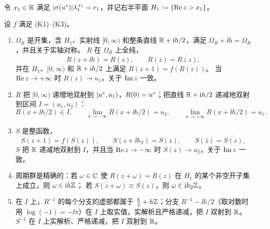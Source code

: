 令 $x_1\in\mathbb{R}$ 满足 $|\sigma(u^{*})|\lambda_1^{\,x_1}=r_1$，并记右半平面 $H_1:=\{\operatorname{Re} z>x_1\}$。

\begin{proposition}[周期性与实结构]\label{prop:regular-periodic}
设 $f$ 满足 \textup{(K1)--(K3)}。
\begin{enumerate}[label=(\alph*)]
\item $\Omega_R$ 是开集，含 $H_1$、实射线 $[0,\infty)$ 和整条直线 $\mathbb{R}+\mathrm{i} h/2$，满足 $\Omega_R+\ii h=\Omega_R$，并且关于实轴对称。
  $R$ 在 $\Omega_R$ 上全纯，
  \[
    R(z+\ii h)=R(z),\qquad R(\bar z)=\overline{R(z)},
  \]
  并在 $H_1$、$[0,\infty)$ 和 $\mathbb{R}+\mathrm{i} h/2$ 上满足 $R(z+1)=f(R(z))$。
  当 $\operatorname{Re} z\to+\infty$ 时 $R(z)\to u_1$，关于 $\operatorname{Im} z$ 一致。
\item $R$ 把 $[0,\infty)$ 递增地双射到 $[u^{*},u_1)$，$R(0)=u^{*}$；把直线 $\mathbb{R}+\mathrm{i} h/2$ 递减地双射到区间 $I=(u_1,u_2)$：
  \[
    R(x+\ii h/2)\in I,\qquad \lim_{x\to-\infty}R(x+\ii h/2)=u_2,\qquad\lim_{x\to+\infty}R(x+\ii h/2)=u_1 .
  \]
\item $S$ 是整函数，
  \[
    S(z+1)=f(S(z)),\qquad S(z+\ii h_2)=S(z),\qquad S(\bar z)=\overline{S(z)},
  \]
  $S$ 把 $\mathbb{R}$ 递减地双射到 $I$，并且当 $\operatorname{Re} z\to-\infty$ 时 $S(z)\to u_2$，关于 $\operatorname{Im} z$ 一致。
\item 周期群是精确的：若 $\omega\in\mathbb{C}$ 使 $R(z+\omega)=R(z)$ 在 $H_1$ 的某个非空开子集上成立，则 $\omega\in\mathrm{i} h\mathbb{Z}$；
  若 $S(z+\omega)\equiv S(z)$，则 $\omega\in\mathrm{i} h_2\mathbb{Z}$。
\item 在 $I$ 上，$R^{-1}$ 的每个分支的虚部都属于 $\frac h2+h\mathbb{Z}$；分支 $R^{-1}-\ii h/2$（取对数时用 $\log(-1)=-\ii\pi$）在 $I$ 上取实值，实解析且严格递减，把 $I$ 双射到 $\mathbb{R}$。
  $S^{-1}$ 在 $I$ 上实解析、严格递减，把 $I$ 双射到 $\mathbb{R}$。
\end{enumerate}
\end{proposition}

